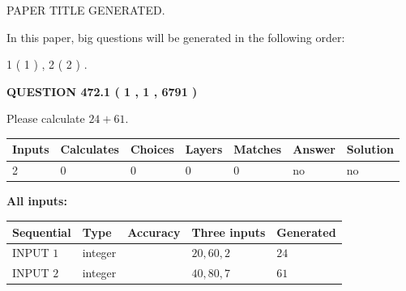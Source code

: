 \documentclass[12pt]{article}
\begin{document}
   
\vspace{0.2in}
   
   
   
   
   
   
   
   
 \vspace{0.2in}
 
 
 
 
   
   
 PAPER TITLE GENERATED.
   
   
   
\vspace{0.2in}
   
In this paper, big questions will be generated in the following order: 
   
   
   1 ( 1 )
 ,
   2 ( 2 )
 .
  
\vspace{0.2in}
  
{\textbf{\Large{QUESTION
472.1 
 ( 1 , 1 , 6791 )
}}}
  
  
 
Please calculate $ %
24 +  %
61 $.
 
 
   
   
   
   
\noindent\begin{tabular}{|l|l|l|l|l|l|l|}
 \hline
Inputs & Calculates & Choices & Layers & Matches & Answer & Solution \\ \hline
 2  & 
 0  & 
 0
  & 
 0  & 
 0  & 
  no & 
  no 
  \\ \hline
 \end{tabular}
   
   
   
   
\noindent{}
   
   
   
   
\noindent\vspace{0.1in}\hspace{-0.08in} {\textbf{\Large{All inputs: }}}
   
   
  
  
\noindent\begin{tabular}{|l|l|l|l|l|}
\hline
 Sequential & Type & Accuracy & Three inputs & Generated \\ 
\hline
 
 
  INPUT $  1 $ & integer &  & $
 20
 , 
 60
 , 
 2
 $ & $ 24 $ 
 \\  \hline  
 
 
  INPUT $  2 $ & integer &  & $
 40
 , 
 80
 , 
 7
 $ & $ 61 $ 
 \\  \hline  
 \end{tabular}
   
\end{document}
